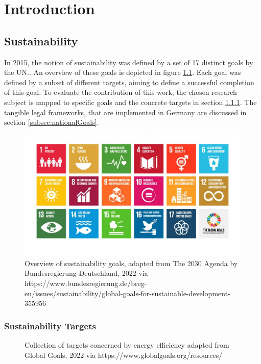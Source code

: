 \chapter{Introduction}\label{chap:introduction}

\section{Sustainability}\label{sec:sustainability}
In 2015, the notion of \gls{sustainability} was defined by a set of 17 distinct goals by the UN.\cite{UN_sustain}. An overview of these goals is depicted in figure \ref{fig:sustainGoals}. Each goal was defined by a subset of different targets, aiming to define a successful completion of this goal. To evaluate the contribution of this work, the chosen research subject is mapped to specific goals and the concrete targets in section \ref{subsec:sustainabilityGoals}. The tangible legal frameworks, that are implemented in Germany are discussed in section \ref{subsec:nationalGoals}.

\begin{figure}
	\centering
	\includegraphics[width=\linewidth]{images/kacheln-the-global-goals.jpg}
	\caption{Overview of sustainability goals, adapted from The 2030 Agenda by Bundesregierung Deutschland, 2022 via https://www.bundesregierung.de/breg-en/issues/sustainability/global-goals-for-sustainable-development-355956}
	\label{fig:sustainGoals}
\end{figure}


\subsection{Sustainability Targets}\label{subsec:sustainabilityGoals}
\begin{figure}
        \centering
        \caption{Collection of targets concerned by energy efficiency adapted from Global Goals, 2022 via https://www.globalgoals.org/resources/}
        \label{fig:targets}
\end{figure}  

